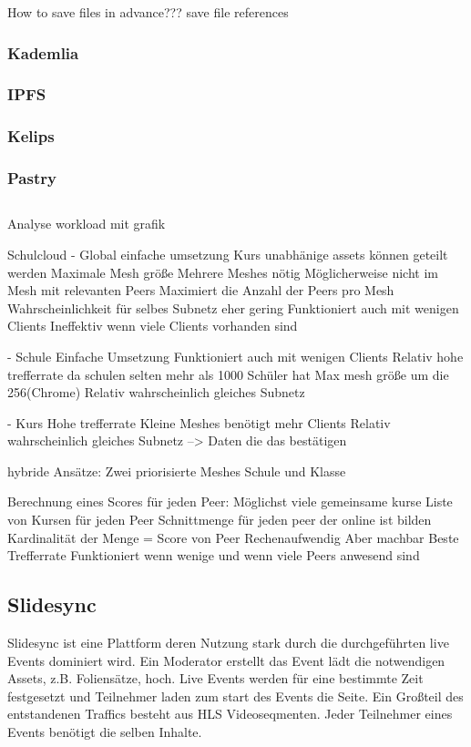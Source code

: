How to save files in advance???
save file references
\subsubsection{Kademlia}
\subsubsection{IPFS}
\subsubsection{Kelips}
\subsubsection{Pastry}
\subsection{\schulCloud}
Analyse workload mit grafik

Schulcloud
- Global
einfache umsetzung
Kurs unabhänige assets können geteilt werden
Maximale Mesh größe
Mehrere Meshes nötig
Möglicherweise nicht im Mesh mit relevanten Peers
Maximiert die Anzahl der Peers pro Mesh
Wahrscheinlichkeit für selbes Subnetz eher gering
Funktioniert auch mit wenigen Clients
Ineffektiv wenn viele Clients vorhanden sind

- Schule
Einfache Umsetzung
Funktioniert auch mit wenigen Clients
Relativ hohe trefferrate da schulen selten mehr als 1000 Schüler hat
Max mesh größe um die 256(Chrome)
Relativ wahrscheinlich gleiches Subnetz

- Kurs
Hohe trefferrate
Kleine Meshes
benötigt mehr Clients
Relativ wahrscheinlich gleiches Subnetz --> Daten die das bestätigen

hybride Ansätze:
Zwei priorisierte Meshes Schule und Klasse

Berechnung eines Scores für jeden Peer:
Möglichst viele gemeinsame kurse
Liste von Kursen für jeden Peer
Schnittmenge für jeden peer der online ist bilden
Kardinalität der Menge = Score von Peer
Rechenaufwendig Aber machbar
Beste Trefferrate
Funktioniert wenn wenige und wenn viele Peers anwesend sind

\subsection{Slidesync}
Slidesync ist eine Plattform deren Nutzung stark durch die durchgeführten live Events dominiert wird. Ein Moderator erstellt das Event lädt die notwendigen Assets, z.B. Foliensätze, hoch. Live Events werden für eine bestimmte Zeit festgesetzt und Teilnehmer laden zum start des Events die Seite. Ein Großteil des entstandenen Traffics besteht aus HLS Videoseqmenten. Jeder Teilnehmer eines Events benötigt die selben Inhalte. 

